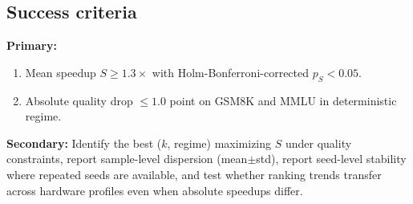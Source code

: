 \subsection{Success criteria}

\noindent\textbf{Primary:}
\begin{enumerate}
    \item Mean speedup $S \geq 1.3\times$ with Holm-Bonferroni-corrected $p_S < 0.05$.
    \item Absolute quality drop $\leq 1.0$ point on GSM8K and MMLU in deterministic regime.
\end{enumerate}

\noindent\textbf{Secondary:} Identify the best ($k$, regime) maximizing $S$ under quality constraints, report sample-level dispersion (mean$\pm$std), report seed-level stability where repeated seeds are available, and test whether ranking trends transfer across hardware profiles even when absolute speedups differ.
